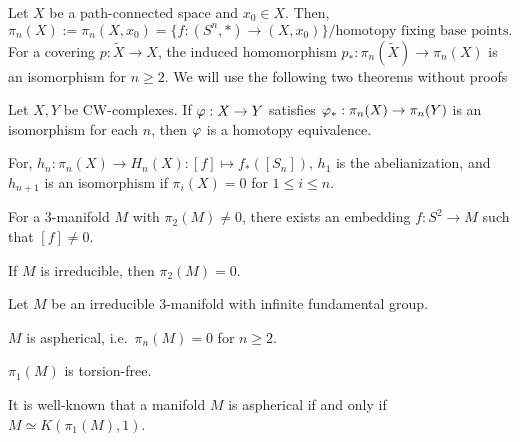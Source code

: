 \documentclass{../../../small}
\begin{document}
Let $X$ be a path-connected space and $x_0\in X$.
Then,
\[\pi_n(X):=\pi_n(X,x_0)=\{f:(S^n,*)\to (X,x_0)\}/\text{homotopy fixing base points}.\]
For a covering $p:\tilde X\to X$, the induced homomorphism $p_*:\pi_n(\tilde X)\to\pi_n(X)$ is an isomorphism for $n\ge2$.
We will use the following two theorems without proofs
\begin{thm*}
Let $X,Y$ be CW-complexes.
If $\varphi:X\to Y$ satisfies $\varphi_*:\pi_n(X)\to\pi_n(Y)$ is an isomorphism for each $n$, then $\varphi$ is a homotopy equivalence.
\end{thm*}
\begin{thm*}
For, $h_n:\pi_n(X)\to H_n(X):[f]\mapsto f_*([S_n])$, $h_1$ is the abelianization, and $h_{n+1}$ is an isomorphism if $\pi_i(X)=0$ for $1\le i\le n$.
\end{thm*}
\setcounter{thm}{3}
\begin{thm}
For a 3-manifold $M$ with $\pi_2(M)\ne0$, there exists an embedding $f:S^2\to M$ such that $[f]\ne0$.
\end{thm}
\begin{cor}
If $M$ is irreducible, then $\pi_2(M)=0$.
\end{cor}
\begin{thm}
Let $M$ be an irreducible 3-manifold with infinite fundamental group.
\begin{parts}
\item $M$ is aspherical, i.e.~$\pi_n(M)=0$ for $n\ge2$.
\item $\pi_1(M)$ is torsion-free.
\end{parts}
It is well-known that a manifold $M$ is aspherical if and only if $M\simeq K(\pi_1(M),1)$.
\end{thm}
\end{document}
